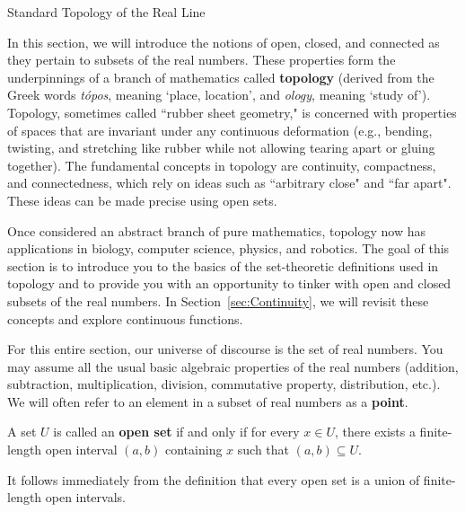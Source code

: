 \begin{section}{Standard Topology of the Real Line}\label{sec:Topology}

In this section, we will introduce the notions of open, closed, and connected as they pertain to subsets of the real numbers.  These properties form the underpinnings of a branch of mathematics called \textbf{topology} (derived from the Greek words \emph{t\'opos}, meaning `place, location', and \emph{ology}, meaning `study of'). Topology, sometimes called ``rubber sheet geometry," is concerned with properties of spaces that are invariant under any continuous deformation (e.g., bending, twisting, and stretching like rubber while not allowing tearing apart or gluing together). The fundamental concepts in topology are continuity, compactness, and connectedness, which rely on ideas such as ``arbitrary close" and ``far apart". These ideas can be made precise using open sets.  

Once considered an abstract branch of pure mathematics, topology now has applications in biology, computer science, physics, and robotics. The goal of this section is to introduce you to the basics of the set-theoretic definitions used in topology and to provide you with an opportunity to tinker with open and closed subsets of the real numbers. In Section~\ref{sec:Continuity}, we will revisit these concepts and explore continuous functions.

For this entire section, our universe of discourse is the set of real numbers.  You may assume all the usual basic algebraic properties of the real numbers (addition, subtraction, multiplication, division, commutative property, distribution, etc.). We will often refer to an element in a subset of real numbers as a \textbf{point}.

\begin{definition}
A set $U$ is called an \textbf{open set} if and only if for every $x \in U$, there exists a finite-length open interval $(a,b)$ containing $x$ such that $(a,b)\subseteq U$.
\end{definition}

It follows immediately from the definition that every open set is a union of finite-length open intervals.


\end{section}
